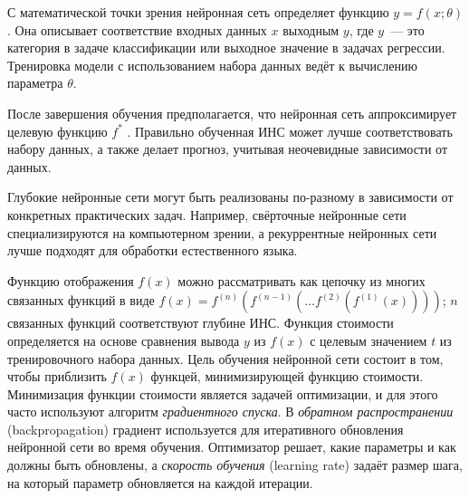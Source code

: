 С математической точки зрения нейронная сеть определяет функцию ${y = f(x; \theta)}$. Она описывает соответствие входных данных ${x}$ выходным ${y}$, где ${y}$~--- это категория в задаче классификации или выходное значение в задачах регрессии. Тренировка модели с использованием набора данных ведёт к вычислению параметра {$\theta$}.

После завершения обучения предполагается, что нейронная сеть аппроксимирует целевую функцию ${f^*}$ \cite{Goodfellow-et-al-2016}. Правильно обученная ИНС может лучше соответствовать набору данных, а также делает прогноз, учитывая неочевидные зависимости от данных.

Глубокие нейронные сети могут быть реализованы по-разному в зависимости от конкретных практических задач. Например, свёрточные нейронные сети специализируются на компьютерном зрении, а рекуррентные нейронных сети лучше подходят для обработки естественного языка.

Функцию отображения ${f(x)}$ можно рассматривать как цепочку из многих связанных функций в виде  ${f(x) = f^{(n)}(f^{(n-1)}(...f^{(2)}(f^{(1)}(x))))}$; ${n}$ связанных функций соответствуют глубине ИНС. Функция стоимости определяется на основе сравнения вывода ${y}$ из ${f(x)}$ с целевым значением ${t}$ из тренировочного набора данных. Цель обучения нейронной сети состоит в том, чтобы приблизить ${f(x)}$ функцей, минимизирующей функцию стоимости. Минимизация функции стоимости является задачей оптимизации, и для этого часто используют алгоритм {\itshape градиентного спуска}. В {\itshape обратном распространении} (backpropagation) градиент используется для итеративного обновления нейронной сети во время обучения. Оптимизатор решает, какие параметры и как должны быть обновлены, а {\itshape скорость обучения} (learning rate) задаёт размер шага, на который параметр обновляется на каждой итерации.
